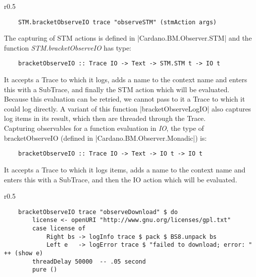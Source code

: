 \begin{wrapfigure}{r}{0.5\textwidth}
    \begin{center}\begin{scriptsize}\begin{verbatim}
    STM.bracketObserveIO trace "observeSTM" (stmAction args)
    \end{verbatim}\end{scriptsize}\end{center}
\end{wrapfigure}

The capturing of STM actions is defined in |Cardano.BM.Observer.STM| and the
function \emph{STM.bracketObserveIO} has type:
\begin{verbatim}
    bracketObserveIO :: Trace IO -> Text -> STM.STM t -> IO t
\end{verbatim}
It accepts a Trace to which it logs, adds a name to the context name and enters
this with a SubTrace, and finally the STM action which will be evaluated.
Because this evaluation can be retried, we cannot pass to it a Trace to which it
could log directly. A variant of this function |bracketObserveLogIO| also
captures log items in its result, which then are threaded through the Trace.
\\
Capturing observables for a function evaluation in \emph{IO}, the type of
\mbox{bracketObserveIO} (defined in |Cardano.BM.Observer.Monadic|) is:
\begin{verbatim}
    bracketObserveIO :: Trace IO -> Text -> IO t -> IO t
\end{verbatim}

It accepts a Trace to which it logs items, adds a name to the context name and
enters this with a SubTrace, and then the IO action which will be evaluated.

\begin{wrapfigure}{r}{0.5\textwidth}
    \vspace{-10pt}
    \begin{center}\begin{scriptsize}\begin{verbatim}
    bracketObserveIO trace "observeDownload" $ do
        license <- openURI "http://www.gnu.org/licenses/gpl.txt"
        case license of
            Right bs -> logInfo trace $ pack $ BS8.unpack bs
            Left e   -> logError trace $ "failed to download; error: " ++ (show e)
        threadDelay 50000  -- .05 second
        pure ()
    \end{verbatim}\end{scriptsize}\end{center}
  \end{wrapfigure}

